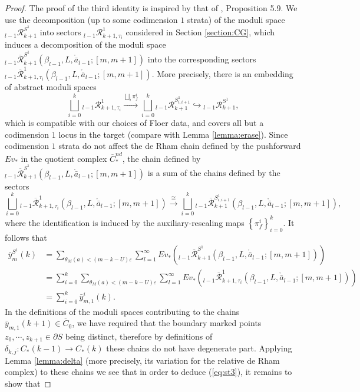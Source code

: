 \documentclass[a4paper]{article}
\numberwithin{equation}{section}
\begin{document}
\begin{proof}
The proof of the third identity is inspired by that of \cite{sg1}, Proposition 5.9. We use the decomposition (up to some codimension $1$ strata) of the moduli space ${}_{l-1}\mathcal{R}_{k+1}^{S^1}$ into sectors ${}_{l-1}\mathcal{R}_{k+1,\tau_i}^1$ considered in Section \ref{section:CG}, which induces a decomposition of the moduli space ${}_{l-1}\overline{\mathcal{R}}_{k+1}^{S^1}(\beta_{l-1},L,\ring{\bar{a}}_{l-1};[m,m+1])$ into the corresponding sectors ${}_{l-1}\overline{\mathcal{R}}_{k+1,\tau_i}^1(\beta_{l-1},L,\ring{\bar{a}}_{l-1};[m,m+1])$. More precisely, there is an embedding of abstract moduli spaces
\begin{equation}
\bigsqcup_{i=0}^k{}_{l-1}\mathcal{R}_{k+1,\tau_i}^1\xrightarrow{\bigsqcup_i\pi_f^i}\bigsqcup_{i=0}^k{}_{l-1}\mathcal{R}_{k+1}^{S_{i,i+1}^1}\hookrightarrow{}_{l-1}\mathcal{R}_{k+1}^{S^1},
\end{equation}
which is compatible with our choices of Floer data, and covers all but a codimension $1$ locus in the target (compare with Lemma \ref{lemma:erase}). Since codimension $1$ strata do not affect the de Rham chain defined by the pushforward $\mathit{Ev}_\ast$ in the quotient complex $\overline{C}_\ast^\mathit{nd}$, the chain defined by ${}_{l-1}\overline{\mathcal{R}}_{k+1}^{S^1}(\beta_{l-1},L,\ring{\bar{a}}_{l-1};[m,m+1])$ is a sum of the chains defined by the sectors
\begin{equation}
\bigsqcup_{i=0}^k{}_{l-1}\overline{\mathcal{R}}_{k+1,\tau_i}^1(\beta_{l-1},L,\ring{\bar{a}}_{l-1};[m,m+1])\xrightarrow{\cong}\bigsqcup_{i=0}^k{}_{l-1}\overline{\mathcal{R}}_{k+1}^{S_{i,i+1}^1}(\beta_{l-1},L,\ring{\bar{a}}_{l-1};[m,m+1]),
\end{equation}
where the identification is induced by the auxiliary-rescaling maps $\left\{\pi_f^i\right\}_{i=0}^k$. It follows that
\begin{equation}
\begin{split}
\bar{y}_m^{S^1}(k)&=\sum_{\theta_M(a)<(m-k-U)\varepsilon}\sum_{l=1}^\infty\mathit{Ev}_\ast\left({}_{l-1}\overline{\mathcal{R}}_{k+1}^{S^1}(\beta_{l-1},L,\ring{\bar{a}}_{l-1};[m,m+1])\right) \\
&=\sum_{i=0}^k\sum_{\theta_M(a)<(m-k-U)\varepsilon}\sum_{l=1}^\infty\mathit{Ev}_\ast\left({}_{l-1}\overline{{\mathcal{R}}}_{k+1,\tau_i}^1(\beta_{l-1},L,\ring{\bar{a}}_{l-1};[m,m+1])\right) \\
&=\sum_{i=0}^k\bar{y}_{m,1}^i(k).
\end{split}
\end{equation}
In the definitions of the moduli spaces contributing to the chains $\bar{y}_{m,1}(k+1)\in\overline{C}_0$, we have required that the boundary marked points $z_0,\cdots,z_{k+1}\in\partial S$ being distinct, therefore by definitions of $\delta_{k,j}:C_\ast(k-1)\rightarrow C_\ast(k)$ these chains do not have degenerate part. Applying Lemma \ref{lemma:delta} (more precisely, its variation for the relative de Rham complex) to these chains we see that in order to deduce (\ref{eq:st3}), it remains to show that

\end{proof}
\end{document}
